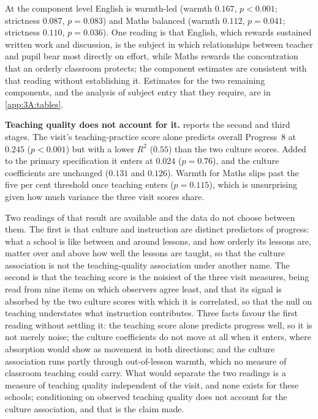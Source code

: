 At the component level English is warmth-led (warmth $0.167$, $p < 0.001$;
strictness $0.087$, $p = 0.083$) and Maths balanced (warmth $0.112$,
$p = 0.041$; strictness $0.110$, $p = 0.036$). One reading is that English,
which rewards sustained written work and discussion, is the subject in which
relationships between teacher and pupil bear most directly on effort, while
Maths rewards the concentration that an orderly classroom protects; the
component estimates are consistent with that reading without establishing
it. Estimates for the two remaining components, and the analysis of subject
entry that they require, are in \cref{app:3A:tables}.

\textbf{Teaching quality does not account for it.} 
reports the second and third stages. The visit's teaching-practice score alone
predicts overall Progress~8 at $0.245$ ($p < 0.001$) but with a lower $R^2$
($0.55$) than the two culture scores. Added to the primary specification it
enters at $0.024$ ($p = 0.76$), and the culture coefficients are unchanged
($0.131$ and $0.126$). Warmth for Maths slips past the five per cent threshold
once teaching enters ($p = 0.115$), which is unsurprising given how much
variance the three visit scores share.

Two readings of that result are available and the data do not choose between
them. The first is that culture and instruction are distinct predictors of
progress: what a school is like between and around lessons, and how orderly
its lessons are, matter over and above how well the lessons are taught, so
that the culture association is not the teaching-quality association under
another name. The second is that the teaching score is the noisiest of the
three visit measures, being read from nine items on which observers agree
least, and that its signal is absorbed by the two culture scores with which
it is correlated, so that the null on teaching understates what instruction
contributes. Three facts favour the first reading without settling it: the
teaching score alone predicts progress well, so it is not merely noise; the
culture coefficients do not move at all when it enters, where absorption
would show as movement in both directions; and the culture association runs
partly through out-of-lesson warmth, which no measure of classroom teaching
could carry. What would separate the two readings is a measure of teaching
quality independent of the visit, and none exists for these schools;
conditioning on observed teaching quality does not account for the culture
association, and that is the claim made.

